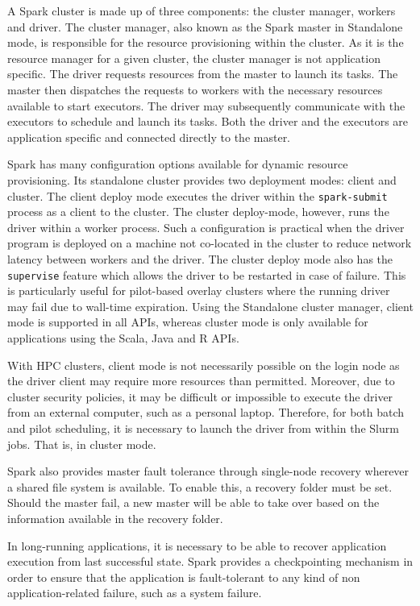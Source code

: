 	A Spark cluster is made up of three components: the cluster manager,
	workers and driver. The cluster manager, also known as the Spark master
	in Standalone mode, is responsible for the resource provisioning within
	the cluster.  As it is the resource manager for a given cluster, the
	cluster manager is not application specific. The driver requests
	resources from the master to launch its tasks. The master then
	dispatches the requests to workers with the necessary resources
	available to start executors. The driver may subsequently communicate
	with the executors to schedule and launch its tasks. Both the driver and
	the executors are application specific and connected directly to the
	master. 
    
	Spark has many configuration options available for dynamic resource
	provisioning. Its standalone cluster provides two deployment modes:
	client and cluster. The client deploy mode executes the driver within
	the \texttt{spark-submit} process as a client to the cluster. The
	cluster deploy-mode, however, runs the driver within a worker process.
	Such a configuration is practical when the driver program is deployed on
	a machine not co-located in the cluster to reduce network latency
	between workers and the driver. The cluster deploy mode also has the
	\texttt{supervise} feature which allows the driver to be restarted in
	case of failure. This is particularly useful for pilot-based overlay
	clusters where the running driver may fail due to wall-time expiration.
	Using the Standalone cluster manager, client mode is supported in all
	APIs, whereas cluster mode is only available for applications using the
	Scala, Java and R APIs.
    
	With HPC clusters, client mode is not necessarily possible on the login
	node as the driver client may require more resources than permitted.
	Moreover, due to cluster security policies, it may be difficult or
	impossible to execute the driver from an external computer, such as a
	personal laptop. Therefore, for both batch and pilot scheduling, it is
	necessary to launch the driver from within the Slurm jobs. That is, in
	cluster mode.
    
	Spark also provides master fault tolerance through single-node recovery
	wherever a shared file system is available. To enable this, a recovery
	folder must be set. Should the master fail, a new master will be able to
	take over based on the information available in the recovery folder.
    
	In long-running applications, it is necessary to be able to recover
	application execution from last successful state. Spark provides a
	checkpointing mechanism in order to ensure that the application is
	fault-tolerant to any kind of non application-related failure, such as a
	system failure.
    
